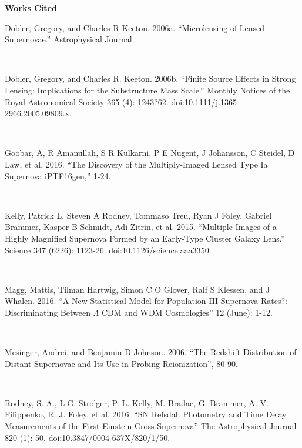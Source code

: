 \pagebreak



\textbf{Works Cited}

Dobler, Gregory, and Charles R Keeton. 2006a. ``Microlensing of Lensed Supernovae.'' Astrophysical Journal.

\

Dobler, Gregory, and Charles R. Keeton. 2006b. ``Finite Source Effects in Strong Lensing: Implications for the Substructure Mass Scale.'' Monthly Notices of the Royal Astronomical Society 365 (4): 1243?62. doi:10.1111/j.1365-2966.2005.09809.x.

\

Goobar, A, R Amanullah, S R Kulkarni, P E Nugent, J Johansson, C Steidel, D Law, et al. 2016. ``The Discovery of the Multiply-Imaged Lensed Type Ia Supernova iPTF16geu,'' 1-24.

\

Kelly, Patrick L, Steven A Rodney, Tommaso Treu, Ryan J Foley, Gabriel Brammer, Kasper B Schmidt, Adi Zitrin, et al. 2015. ``Multiple Images of a Highly Magnified Supernova Formed by an Early-Type Cluster Galaxy Lens.'' Science 347 (6226): 1123-26. doi:10.1126/science.aaa3350.

\

Magg, Mattis, Tilman Hartwig, Simon C O Glover, Ralf S Klessen, and J Whalen. 2016. ``A New Statistical Model for Population III Supernova Rates?: Discriminating Between $\Lambda$ CDM and WDM Cosmologies'' 12 (June): 1-12.

\

Mesinger, Andrei, and Benjamin D Johnson. 2006. ``The Redshift Distribution of Distant Supernovae and Its Use in Probing Reionization'', 80-90.

\

Rodney, S. A., L.G. Strolger, P. L. Kelly, M. Bradac, G. Brammer, A. V. Filippenko, R. J. Foley, et al. 2016. ``SN Refsdal: Photometry and Time Delay Measurements of the First Einstein Cross Supernova'' The Astrophysical Journal 820 (1): 50. doi:10.3847/0004-637X/820/1/50.







